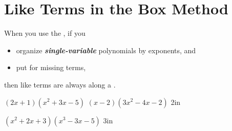\section{Like Terms in the Box Method}

When you use the ,
if you 
\begin{itemize}[topsep=0in]
    \item organize {\bfseries\itshape single-variable} polynomials by  exponents, and 
    \item put  for missing terms,
\end{itemize}
then like terms are always along a .

\myProblems
    {
        $ (2x+1)  (x^2 + 3x -5) $
    }
    {
        $ (x-2)  (3x^2 - 4x -2) $
    }
    {2in}


\myWideProblem
    {
        $ (x^2+2x+3)  (x^3-3x-5) $
    }
    {3in}
